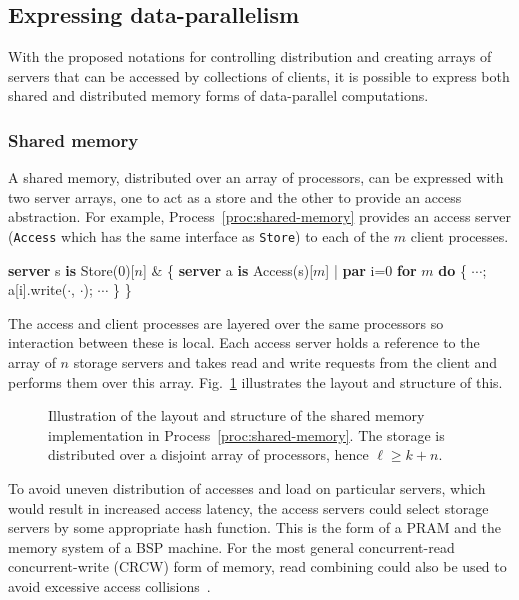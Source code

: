 \documentclass[11pt, conference, compsocconf, onecolumn]{IEEEtran}
\newcommand{\ttt}[1]{\texttt{#1}}
\newcommand{\fig}[1]{Fig.~\ref{fig:#1}}
\newcommand{\proc}[1]{Process~\ref{proc:#1}}
\newcounter{process}
\newenvironment{Process}[1][]{\begin{procfloat}[ht]\vspace{-1.5mm}\refstepcounter{process}{\bf Process~\theprocess} #1}
{\vspace{-3.5mm}\end{procfloat}}
\newcommand{\w}[1]{{\bf #1}}
\newcommand{\inputtikz}[1]{
\begin{center}\end{center}}
\def\codespacing{1.5mm}
\newenvironment{myquote}
{\list{}{\leftmargin=4mm\rightmargin=4mm}\item[]}
{\endlist}
\newenvironment{code*}{\vspace{\codespacing}\begin{myquote}\begin{minipage}{\linewidth}\begin{alltt}}
{\end{alltt}\end{minipage}
\end{myquote}\vspace{\codespacing}
}
\begin{document}
\subsection{Expressing data-parallelism}

With the proposed notations for controlling distribution and creating arrays of
servers that can be accessed by collections of clients, it is possible to
express both shared and distributed memory forms of data-parallel computations.

\subsubsection{Shared memory}

A shared memory, distributed over an array of processors, can be expressed with
two server arrays, one to act as a store and the other to provide an access
abstraction.
For example, \proc{shared-memory} provides an access server (\ttt{Access} which
has the same interface as \ttt{Store}) to each of the $m$ client processes.
\begin{Process}
\begin{code*}
\w{server} s \w{is} Store(0)[\(n\)] &
\{ \w{server} a \w{is} Access(s)[\(m\)] |
  \w{par} i=0 \w{for} \(m\) \w{do}
  \{ \(\cdots\); a[i].write(\(\cdot\), \(\cdot\)); \(\cdots\) \}
\}
\end{code*}
\label{proc:shared-memory}
\end{Process}
The access and client processes are layered over the same processors so
interaction between these is local. Each access server holds a reference to the
array of $n$ storage servers and takes read and write requests from the client and
performs them over this array. \fig{shared-memory} illustrates the layout and
structure of this.

\begin{figure}[t]
\inputtikz{figures/server-distributed-shared-memory}
\caption{Illustration of the layout and structure of the shared memory
implementation in \proc{shared-memory}. The storage is distributed over a
disjoint array of processors, hence $\ell \geq k+n$.}
\label{fig:shared-memory}
\end{figure}

To avoid uneven distribution of accesses and load on particular servers, which
would result in increased access latency, the access servers could select
storage servers by some appropriate hash function.  This is the form of a PRAM
and the memory system of a BSP machine.  For the most general concurrent-read
concurrent-write (CRCW) form of memory, read combining could also be used to
avoid excessive access collisions~\cite{Ranade87}.
\end{document}
